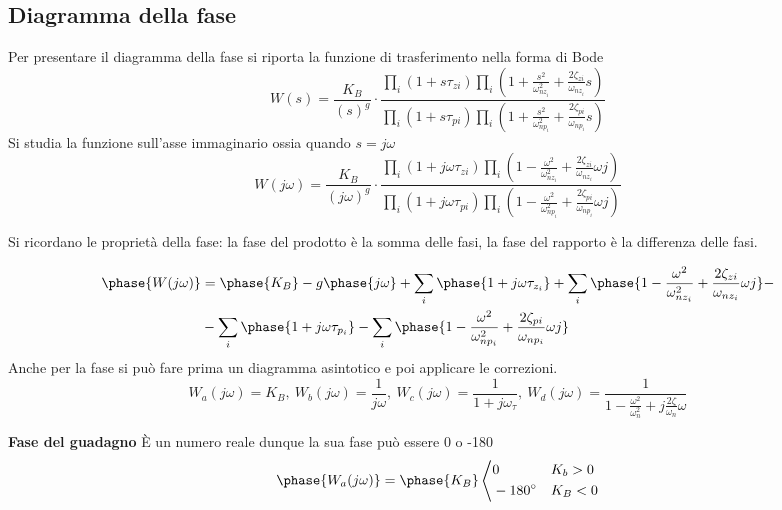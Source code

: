 \subsection{Diagramma della fase}
Per presentare il diagramma della fase si riporta la funzione di trasferimento
nella forma di Bode
$$
W(s) = \frac{K_B}{(s)^g}\cdot \frac{\prod_i (1+s \tau_{zi})
\prod_i \left(1+\frac{s^2}{\omega_{nz_i}^2} +
\frac{2\zeta_{zi}}{\omega_{nz_i}}s\right) }
{\prod_i (1+s \tau_{pi})
\prod_i \left(1+\frac{s^2}{\omega_{np_i}^2} +
\frac{2\zeta_{pi}}{\omega_{np_i}}s\right) }
$$
Si studia la funzione sull'asse immaginario ossia quando $s=j\omega$
$$
W({j\omega}) = \frac{K_B}{({j\omega})^g}\cdot \frac{\prod_i (1+{j\omega}
\tau_{zi})
\prod_i \left(1-\frac{\omega^2}{\omega_{nz_i}^2} +
\frac{2\zeta_{zi}}{\omega_{nz_i}}\omega j\right) }
{\prod_i (1+{j\omega} \tau_{pi})
\prod_i \left(1-\frac{\omega^2}{\omega_{np_i}^2} +
\frac{2\zeta_{pi}}{\omega_{np_i}}\omega j\right) }$$

Si ricordano le proprietà della fase: la fase del prodotto è la somma delle
fasi, la fase del rapporto è la differenza delle fasi.

$$\begin{aligned}
\phase{W(j\omega)} &= \phase{K_B} - g\phase{j\omega} +
\sum_i\phase{1+j\omega\tau_{z_i}} +
\sum_i\phase{1-\frac{\omega^2}{\omega_{nz_i}^2}+\frac{2\zeta_{zi}}{\omega_{nz_i}
}\omega j} - \\
&-\sum_i\phase{1+j\omega\tau_{p_i}} -
\sum_i\phase{1-\frac{\omega^2}{\omega_{np_i}^2} +
\frac{2\zeta_{pi}}{\omega_{np_i}}\omega j}
\end{aligned}$$
Anche per la fase si può fare prima un diagramma asintotico e poi applicare le
correzioni.
$$
W_a(j\omega) = K_B,\ W_b(j\omega) = \frac{1}{j\omega},\
W_c(j\omega)=\frac{1}{1+j\omega_\tau},\ W_d(j\omega) =
\frac{1}{1-\frac{\omega^2}{\omega_n^2}+j\frac{2\zeta}{\omega_n}\omega}
$$

\textbf{Fase del guadagno} È un numero reale dunque la sua fase può essere 0
o -180\textdegree
$$
\phase{W_a(j\omega)} = \phase{K_B} \left\langle
\begin{aligned}
& 0 & & K_b > 0 \\
& \SI{-180}{\degree} & & K_B <0
\end{aligned}\right.
$$
\begin{figure}[h]
\centering
{}
\end{figure}


